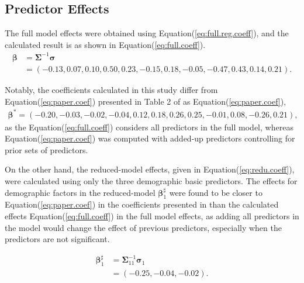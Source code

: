 \subsection{Predictor Effects}
The full model effects were obtained using Equation(\ref{eq:full.reg.coeff}), and the calculated result is as shown in  Equation(\ref{eq:full.coeff}). 
\begin{equation}\begin{aligned}
\label{eq:full.coeff}
\boldsymbol{\beta} &= \boldsymbol{\Sigma}^{-1}\boldsymbol{\sigma} \\
&= (-0.13,  0.07,  0.10,  0.50,  0.23, -0.15,  0.18, -0.05, -0.47,  0.43,  0.14,  0.21). 
\end{aligned}\end{equation}

Notably, the coefficients calculated in this study differ from Equation(\ref{eq:paper.coef}) presented in Table 2 of \cite{baker2008chronicpain} as Equation(\ref{eq:paper.coef}),
\begin{equation}\begin{aligned}
\label{eq:paper.coef}\boldsymbol{\beta^*} = (-0.20, -0.03, -0.02, -0.04, 0.12, 0.18, 0.26, 0.25, -0.01, 0.08, -0.26, 0.21),\end{aligned}\end{equation}
as the Equation(\ref{eq:full.coeff}) considers all predictors in the full model, whereas Equation(\ref{eq:paper.coef}) was computed with added-up predictors controlling for prior sets of predictors. 

On the other hand, the reduced-model effects, given in Equation(\ref{eq:redu.coeff}), were calculated using only the three demographic basic predictors. The effects for demographic factors in the reduced-model $\boldsymbol{\beta}_1^\sharp$ were found to be closer to Equation(\ref{eq:paper.coef}) in the coefficients presented in \cite{baker2008chronicpain} than the calculated effects Equation(\ref{eq:full.coeff}) in the full model effects, as adding all predictors in the model would change the effect of previous predictors, especially when the predictors are not significant.

\begin{equation}\begin{aligned}
\label{eq:redu.coeff}
\boldsymbol{\beta}_1^\sharp &= \boldsymbol{\Sigma}_{11}^{-1}\boldsymbol{\sigma}_1\\
&=(-0.25 , -0.04,  -0.02).
\end{aligned}\end{equation}



